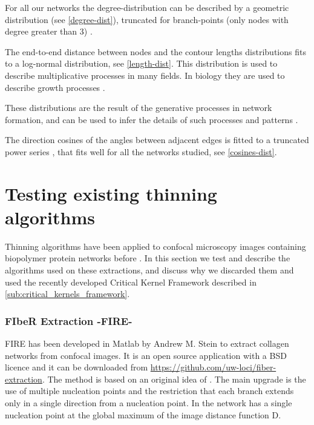 For all our networks the degree-distribution can be described by a geometric distribution (see \autoref{degree-dist}), truncated for branch-points (only nodes with degree greater than 3) .

The end-to-end distance between nodes and the contour lengths distributions fits to a
log-normal distribution, see \autoref{length-dist}. This distribution is used to describe multiplicative processes in many fields.
In biology they are used to describe growth processes \cite{mitzenmacher_brief_2004}.

These distributions are the result of the generative processes in network formation, and can be used to infer the details of such processes and patterns \cite{frank_common_2009, frank_how_2014}.

The direction cosines of the angles between adjacent edges is fitted to a truncated power series \cite{lindstrom_finite-strain_2013}, that fits well for all the networks studied, see \autoref{cosines-dist}.


\section{Testing existing thinning algorithms}%
\label{sub:testing_other_thinning_algorithms}

Thinning algorithms have been applied to confocal microscopy images containing biopolymer protein networks before \cite{stein_algorithm_2008, lindstrom_biopolymer_2010}.
In this section we test and describe the algorithms used on these extractions, and discuss why we discarded them and used the recently developed Critical Kernel Framework \cite{bertrand_powerful_2014} described in \autoref{sub:critical_kernels_framework}.

\subsubsection{FIbeR Extraction -FIRE-}
\label{subsub:FIRE}

FIRE has been developed in Matlab by Andrew M. Stein
  \citep{stein_mathematical_2007} to extract collagen networks from confocal
  images. It is an open source application with a BSD licence and it can be downloaded from
  \url{https://github.com/uw-loci/fiber-extraction}. The method
  \citep{stein_algorithm_2008} is based on an original idea of
  \citet{wu_automated_2003}. The main upgrade is the use of multiple nucleation
  points  and the restriction that each branch extends only  in a single
  direction from a nucleation point. In \citet{wu_automated_2003} the network has a single nucleation point at the global maximum of the image distance function D.

